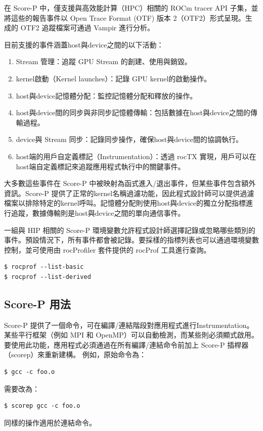 在 Score-P 中，僅支援與高效能計算（HPC）相關的 ROCm tracer API 子集，並將這些的報告事件以 Open Trace Format (OTF) 版本 2（OTF2）形式呈現。生成的 OTF2 追蹤檔案可通過 Vampir 進行分析。

目前支援的事件涵蓋host與device之間的以下活動：

\begin{enumerate}
    \item Stream 管理：追蹤 GPU Stream 的創建、使用與銷毀。
    \item kernel啟動（Kernel launches）：記錄 GPU kernel的啟動操作。
    \item host與device記憶體分配：監控記憶體分配和釋放的操作。
    \item host與device間的同步與非同步記憶體傳輸：包括數據在host與device之間的傳輸過程。
    \item device與 Stream 同步：記錄同步操作，確保host與device間的協調執行。
    \item host端的用戶自定義標記（Instrumentation）：透過 rocTX 實現，用戶可以在host端自定義標記來追蹤應用程式執行中的關鍵事件。
\end{enumerate}



大多數這些事件在 Score-P 中被映射為函式進入/退出事件，但某些事件包含額外資訊。Score-P 提供了正常的kernel名稱過濾功能，因此程式設計師可以提供過濾檔案以排除特定的kernel呼叫。記憶體分配則使用host與device的獨立分配指標進行追蹤，數據傳輸則是host與device之間的單向通信事件。

一組與 HIP 相關的 Score-P 環境變數允許程式設計師選擇記錄或忽略哪些類別的事件。預設情況下，所有事件都會被記錄。要採樣的指標列表也可以通過環境變數控制，並可使用由 rocProfiler 套件提供的 rocProf 工具進行查詢。

\begin{lstlisting}
$ rocprof --list-basic
$ rocprof --list-derived
\end{lstlisting}

\subsection{Score-P 用法}


Score-P 提供了一個命令，可在編譯/連結階段對應用程式進行Instrumentation。某些平行框架（例如 MPI 和 OpenMP）可以自動檢測，而某些則必須顯式啟用。要使用此功能，應用程式必須通過在所有編譯/連結命令前加上 Score-P 插桿器（scorep）來重新建構。
例如，原始命令為：
\begin{lstlisting}
$ gcc -c foo.o
\end{lstlisting}
需要改為：
\begin{lstlisting}
$ scorep gcc -c foo.o
\end{lstlisting}
同樣的操作適用於連結命令。


